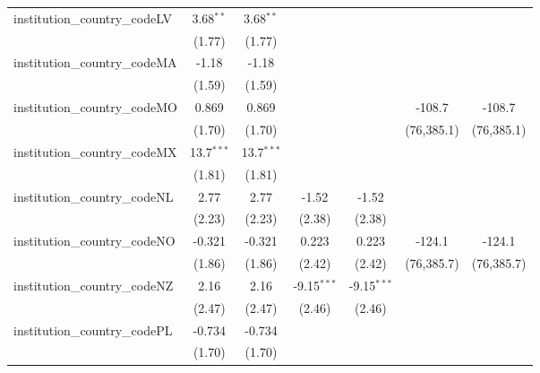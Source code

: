 \begin{tabular}{lcccccc}
   institution\_country\_codeLV          & 3.68$^{**}$   & 3.68$^{**}$   &               &               &              &   \\   
                                         & (1.77)        & (1.77)        &               &               &              &   \\   
   institution\_country\_codeMA          & -1.18         & -1.18         &               &               &              &   \\   
                                         & (1.59)        & (1.59)        &               &               &              &   \\   
   institution\_country\_codeMO          & 0.869         & 0.869         &               &               & -108.7       & -108.7\\   
                                         & (1.70)        & (1.70)        &               &               & (76,385.1)   & (76,385.1)\\   
   institution\_country\_codeMX          & 13.7$^{***}$  & 13.7$^{***}$  &               &               &              &   \\   
                                         & (1.81)        & (1.81)        &               &               &              &   \\   
   institution\_country\_codeNL          & 2.77          & 2.77          & -1.52         & -1.52         &              &   \\   
                                         & (2.23)        & (2.23)        & (2.38)        & (2.38)        &              &   \\   
   institution\_country\_codeNO          & -0.321        & -0.321        & 0.223         & 0.223         & -124.1       & -124.1\\   
                                         & (1.86)        & (1.86)        & (2.42)        & (2.42)        & (76,385.7)   & (76,385.7)\\   
   institution\_country\_codeNZ          & 2.16          & 2.16          & -9.15$^{***}$ & -9.15$^{***}$ &              &   \\   
                                         & (2.47)        & (2.47)        & (2.46)        & (2.46)        &              &   \\   
   institution\_country\_codePL          & -0.734        & -0.734        &               &               &              &   \\   
                                         & (1.70)        & (1.70)        &               &               &              &   \\   

\end{tabular}
